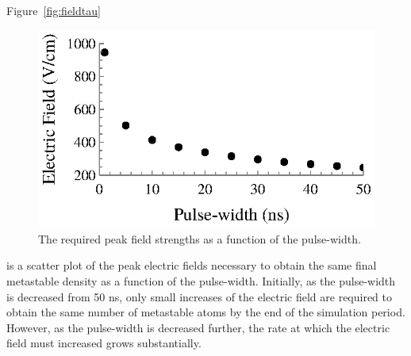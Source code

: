 Figure~\ref{fig:fieldtau}
\begin{figure}
  \centering
  \includegraphics{./chapters/modeling/figures/fieldtau.eps}
  \caption{The required peak field strengths as a function of the pulse-width.}
  \label{fig:fieldtau.eps}
\end{figure}
is a scatter plot of the peak electric fields necessary to obtain the same final
metastable density as a function of the pulse-width. Initially, as the
pulse-width is decreased from 50 ns, only small increases of the electric field
are required to obtain the same number of metastable atoms by the end of the
simulation period. However, as the pulse-width is decreased further, the rate at
which the electric field must increased grows substantially.

